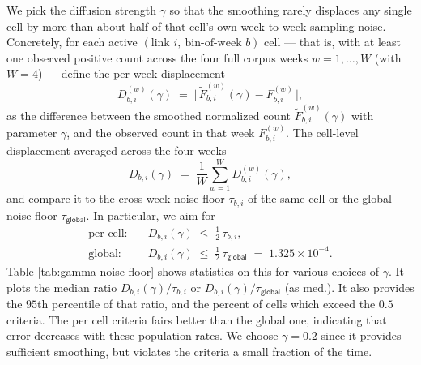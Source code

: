 \documentclass[sigconf, review]{acmart}
\newcommand{\NF}{\tau}
\newcommand{\NFG}{\tau_{\textsf{global}}}
\begin{document}
We pick the diffusion strength $\gamma$ so that
the smoothing rarely displaces any single cell by more than about half of
that cell's own week-to-week sampling noise.   Concretely, for each
active $(\text{link } i,\ \text{bin-of-week } b)$ cell --- that is, with at least
one observed positive count across the four full corpus weeks
$w = 1, \ldots, W$ (with $W=4$) --- define the per-week displacement
\[
D^{(w)}_{b, i}(\gamma)
\;=\;
\Big| \, \tilde F^{(w)}_{b, i}(\gamma) - F^{(w)}_{b, i} \, \Big|,
\]
as the difference between the smoothed normalized count $\tilde F^{(w)}_{b, i}(\gamma)$ with parameter $\gamma$, and the observed count in that week $F^{(w)}_{b, i}$.  
The cell-level displacement averaged across the four weeks
\[
D_{b, i}(\gamma)
\;=\;
\frac{1}{W} \sum_{w = 1}^{W} D^{(w)}_{b, i}(\gamma),
\]
and compare it to the cross-week noise floor
$\NF_{b, i}$ of the same cell or the global noise floor $\NFG$.   In particular, we aim for
\begin{align*}
\text{per-cell:}\quad
  & D_{b, i}(\gamma) \;\le\;
    \tfrac{1}{2}\, \NF_{b, i}, \\[2pt]
\text{global:}\quad
  & D_{b, i}(\gamma) \;\le\;
    \tfrac{1}{2}\, \NFG
    \;=\; 1.325 \times 10^{-4}.
\end{align*}
Table \ref{tab:gamma-noise-floor} shows statistics on this for various choices of $\gamma$.  
It plots the median ratio $D_{b,i}(\gamma)/\NF_{b,i}$ or $D_{b,i}(\gamma)/\NFG$ (as $\text{med.}$).   
It also provides the $95$th percentile of that ratio, and the percent of cells which exceed the $0.5$ criteria.  
The per cell criteria fairs better than the global one, indicating that error decreases with these population rates.  We choose $\gamma = 0.2$ since it provides sufficient smoothing, but violates the criteria a small fraction of the time.  


\end{document}
